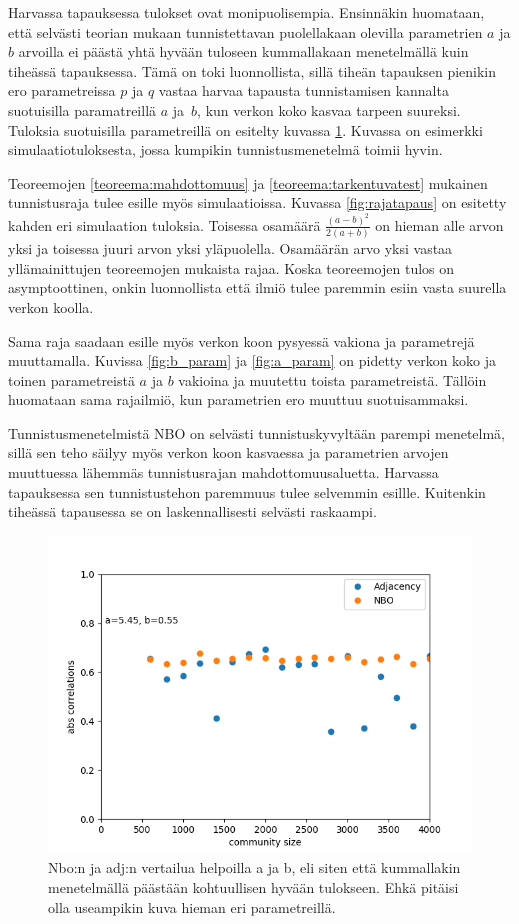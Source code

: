 \documentclass[finnish,12pt,a4paper,pdftex,sci,utf8]{aaltothesis}
\begin{document}
Harvassa tapauksessa tulokset ovat monipuolisempia. Ensinnäkin huomataan, että selvästi teorian mukaan tunnistettavan puolellakaan olevilla parametrien $a$ ja $b$ arvoilla ei päästä yhtä hyvään tuloseen kummallakaan menetelmällä kuin tiheässä tapauksessa. Tämä on toki luonnollista, sillä tiheän tapauksen pienikin ero parametreissa $p$ ja $q$ vastaa harvaa tapausta tunnistamisen kannalta suotuisilla paramatreillä $a$ ja $b$, kun verkon koko kasvaa tarpeen suureksi. Tuloksia suotuisilla parametreillä on esitelty kuvassa \ref{fig:adj_nbo_sp_easy}. Kuvassa on esimerkki simulaatiotuloksesta, jossa kumpikin tunnistusmenetelmä toimii hyvin.

Teoreemojen \ref{teoreema:mahdottomuus} ja \ref{teoreema:tarkentuvatest} mukainen tunnistusraja tulee esille myös simulaatioissa. Kuvassa \ref{fig:rajatapaus} on esitetty kahden eri simulaation tuloksia. Toisessa osamäärä $\frac{(a-b)^2}{2(a+b)}$ on hieman alle arvon yksi ja toisessa juuri arvon yksi yläpuolella. Osamäärän arvo yksi vastaa yllämainittujen teoreemojen mukaista rajaa. Koska teoreemojen tulos on asymptoottinen, onkin luonnollista että ilmiö tulee paremmin esiin vasta suurella verkon koolla.

Sama raja saadaan esille myös verkon koon pysyessä vakiona ja parametrejä muuttamalla. Kuvissa \ref{fig:b_param} ja \ref{fig:a_param} on pidetty verkon koko ja toinen parametreistä $a$ ja $b$ vakioina ja muutettu toista parametreistä. Tällöin huomataan sama rajailmiö, kun parametrien ero muuttuu suotuisammaksi.

Tunnistusmenetelmistä NBO on selvästi tunnistuskyvyltään parempi menetelmä, sillä sen teho säilyy myös verkon koon kasvaessa ja parametrien arvojen muuttuessa lähemmäs tunnistusrajan mahdottomuusaluetta. Harvassa tapauksessa sen tunnistustehon paremmuus tulee selvemmin esillle. Kuitenkin tiheässä tapausessa se on laskennallisesti selvästi raskaampi.

\begin{figure}
	\centering
	\includegraphics{adj_nbo_sp_easy.png}
	\caption{Nbo:n ja adj:n vertailua helpoilla a ja b, eli siten että kummallakin menetelmällä päästään kohtuullisen hyvään tulokseen. Ehkä pitäisi olla useampikin kuva hieman eri parametreillä.}
	\label{fig:adj_nbo_sp_easy}
\end{figure}
\end{document}
